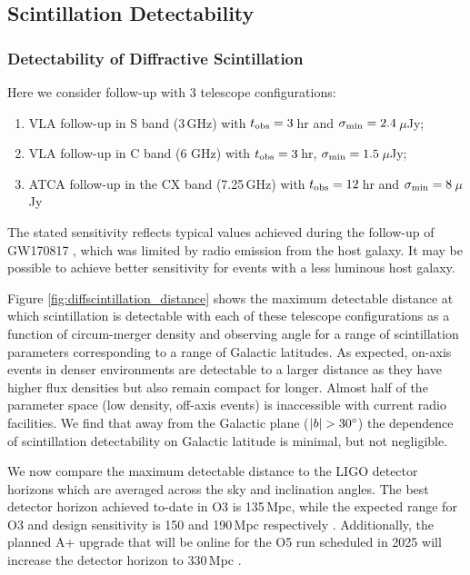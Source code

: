 \subsection{Scintillation Detectability}
\subsubsection{Detectability of Diffractive Scintillation}
\label{subsec:detect_diffractive}
Here we consider follow-up with 3 telescope configurations:
\begin{enumerate}
    \item VLA follow-up in S band (3\,GHz) with $t_{\rm obs} = 3$\,hr and $\sigma_{\rm min} = 2.4$\,$\mu$Jy;
    \item VLA follow-up in C band (6 GHz) with $t_{\rm obs} = 3$\,hr, $\sigma_{\rm min} = 1.5$\,$\mu$Jy;
    \item ATCA follow-up in the CX band (7.25\,GHz) with $t_{\rm obs} = 12$\,hr and $\sigma_{\rm min} = 8$\,$\mu$Jy
\end{enumerate}

The stated sensitivity reflects typical values achieved during the follow-up of\\ GW170817 \citep{2018ApJ...868L..11M}, which was limited by radio emission from the host galaxy. It may be possible to achieve better sensitivity for events with a less luminous host galaxy.

Figure \ref{fig:diffscintillation_distance} shows the maximum detectable distance at which scintillation is detectable with each of these telescope configurations as a function of circum-merger density and observing angle for a range of scintillation parameters corresponding to a range of Galactic latitudes. As expected, on-axis events in denser environments are detectable to a larger distance as they have higher flux densities but also remain compact for longer. Almost half of the parameter space (low density, off-axis events) is inaccessible with current radio facilities. We find that away from the Galactic plane ($|b| > 30\mbox{$^\circ$}$) the dependence of scintillation detectability on Galactic latitude is minimal, but not negligible.

We now compare the maximum detectable distance to the LIGO detector horizons which are averaged across the sky and inclination angles. The best detector horizon achieved to-date in O3 is 135\,Mpc, while the expected range for O3 and design sensitivity is 150 and 190\,Mpc respectively \citep{2018LRR....21....3A}. Additionally, the planned A+ upgrade that will be online for the O5 run scheduled in 2025 will increase the detector horizon to 330\,Mpc \citep{2018LRR....21....3A}.

